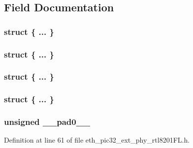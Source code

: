 \subsection{Field Documentation}
\hypertarget{union_____b_m_c_o_nbits__t_a41ccd9f5f0b8eedf790531dd7a99cb60}{}\subsubsection[{"@100}]{\setlength{\rightskip}{0pt plus 5cm}struct \{ ... \} }\label{union_____b_m_c_o_nbits__t_a41ccd9f5f0b8eedf790531dd7a99cb60}
\hypertarget{union_____b_m_c_o_nbits__t_a5a3d26d0a9c6799879d9fe8ed76c40ab}{}\subsubsection[{"@102}]{\setlength{\rightskip}{0pt plus 5cm}struct \{ ... \} }\label{union_____b_m_c_o_nbits__t_a5a3d26d0a9c6799879d9fe8ed76c40ab}
\hypertarget{union_____b_m_c_o_nbits__t_a89cd99fa658f896a569cd4f13a0bc71f}{}\subsubsection[{"@172}]{\setlength{\rightskip}{0pt plus 5cm}struct \{ ... \} }\label{union_____b_m_c_o_nbits__t_a89cd99fa658f896a569cd4f13a0bc71f}
\hypertarget{union_____b_m_c_o_nbits__t_a6885719de50d57b5149069ae32c303b1}{}\subsubsection[{"@174}]{\setlength{\rightskip}{0pt plus 5cm}struct \{ ... \} }\label{union_____b_m_c_o_nbits__t_a6885719de50d57b5149069ae32c303b1}
\hypertarget{union_____b_m_c_o_nbits__t_adf71f3d8410c1f1dbbc96680a92c49af}{}
\subsubsection[{\+\_\+\+\_\+pad0\+\_\+\+\_\+}]{\setlength{\rightskip}{0pt plus 5cm}unsigned \+\_\+\+\_\+pad0\+\_\+\+\_\+}\label{union_____b_m_c_o_nbits__t_adf71f3d8410c1f1dbbc96680a92c49af}


Definition at line 61 of file eth\+\_\+pic32\+\_\+ext\+\_\+phy\+\_\+rtl8201\+F\+L.\+h.

